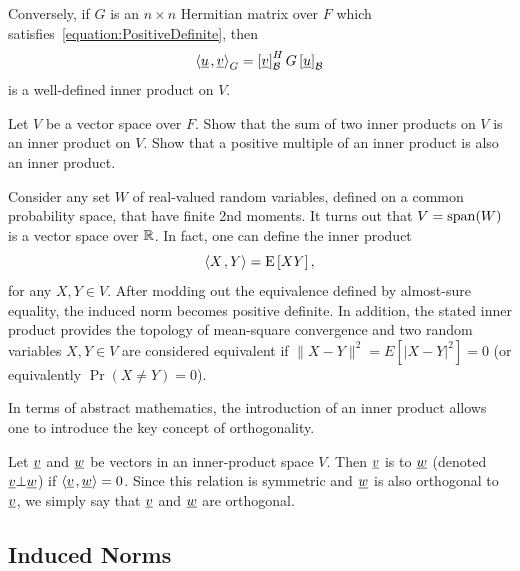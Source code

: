 Conversely, if $G$ is an $n \times n$ Hermitian matrix over $F$ which satisfies~\eqref{equation:PositiveDefinite}, then
\begin{equation*}
{\left\langle  \underline{u}  \mskip2mu ,  \underline{v}  \right\rangle}_G
= \left[ \underline{v} \right]_{\mathcal{B}}^H G \left[ \underline{u} \right]_{\mathcal{B}}
\end{equation*}
is a well-defined inner product on $V$.
\begin{problem}
Let $V$ be a vector space over $F$.
Show that the sum of two inner products on $V$ is an inner product on $V$.
Show that a positive multiple of an inner product is also an inner product.
\end{problem}

\begin{example}
Consider any set $W$ of real-valued random variables, defined on a common probability space, that have finite 2nd moments.
It turns out that $V = \mathrm{span} (W)$ is a vector space over $\mathbb{R}$.
In fact, one can define the inner product
\begin{equation*}
{\left\langle  X  \mskip2mu ,  Y  \right\rangle} = \mathrm{E} \left[ XY \right] ,
\end{equation*}
for any $X,Y \in V$.
After modding out the equivalence defined by almost-sure equality, the induced norm becomes positive definite.
In addition, the stated inner product provides the topology of mean-square convergence and two random variables $X,Y\in V$ are considered equivalent if $\| X-Y \|^2 = E \left[ |X-Y|^2 \right] = 0$ (or equivalently $\Pr (X \neq Y ) = 0$).
\end{example}

In terms of abstract mathematics, the introduction of an inner product allows one to introduce the key concept of orthogonality.

\begin{definition}
Let $\underline{v}$ and $\underline{w}$ be vectors in an inner-product space $V$.
Then $\underline{v}$ is  to $\underline{w}$ (denoted $\underline{v} \bot \underline{w}$) if ${\left\langle  \underline{v}  \mskip2mu ,  \underline{w}  \right\rangle} = 0$.
Since this relation is symmetric and $\underline{w}$ is also orthogonal to $\underline{v}$, we simply say that $\underline{v}$ and $\underline{w}$ are orthogonal.
\end{definition}


\subsection{Induced Norms}


